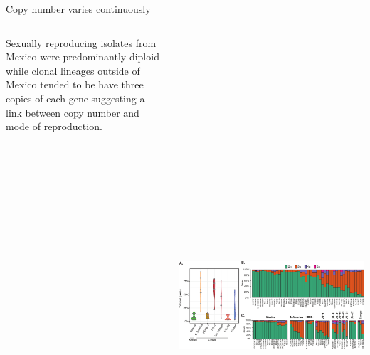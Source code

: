 \begin{columns}[t]
\begin{column}{0.5\textwidth}
\begin{block}{\large Copy number varies continuously}
\begin{columns}
\begin{column}{0.50\textwidth}
\vspace{5mm}

Sexually reproducing isolates from Mexico were predominantly diploid while clonal lineages outside of Mexico tended to be have three copies of each gene suggesting a link between copy number and mode of reproduction.

        \end{column}
        \begin{column}{0.47\textwidth}
          \includegraphics*[viewport=200 0 567 270, clip, height=20cm]{./figures/Fig3_V2.pdf}
        \end{column}
      \end{columns}

    \end{block}

  \end{column}

\end{columns}


